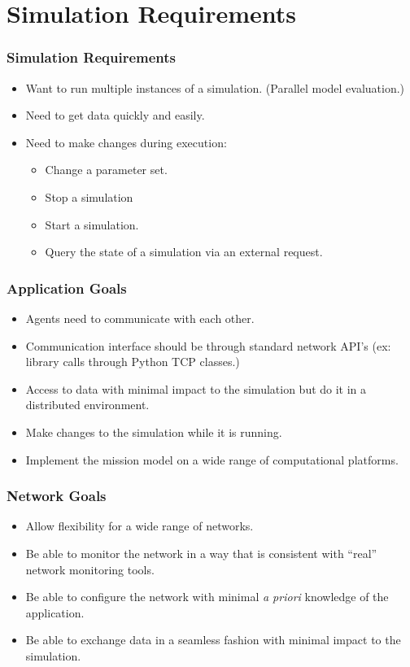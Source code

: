 \documentclass{beamer}
\begin{document}
\section{Simulation Requirements}

\begin{frame}
  \frametitle{Simulation Requirements}

  \begin{itemize}
  \item Want to run multiple instances of a simulation. (Parallel
    model evaluation.)
  \item Need to get data quickly and easily.
  \item Need to make changes during execution:
    \begin{itemize}
    \item Change a parameter set.
    \item Stop a simulation
    \item Start a simulation.
    \item Query the state of a simulation via an external request.
    \end{itemize}
  \end{itemize}

\end{frame}


\begin{frame}
  \frametitle{Application Goals}

  \begin{itemize}
  \item Agents need to communicate with each other.
  \item Communication interface should be through standard network
    API's (ex: library calls through Python TCP classes.)
  \item Access to data with minimal impact to the simulation but do it
    in a distributed environment.
  \item Make changes to the simulation while it is running.
  \item Implement the mission model on a wide range of computational
    platforms.
  \end{itemize}


\end{frame}

\begin{frame}
  \frametitle{Network Goals}

  \begin{itemize}
  \item Allow flexibility for a wide range of networks.
  \item Be able to monitor the network in a way that is consistent
    with ``real'' network monitoring tools.
  \item Be able to configure the network with minimal \textit{a
      priori} knowledge of the application.
  \item Be able to exchange data in a seamless fashion with minimal
    impact to the simulation.
  \end{itemize}

\end{frame}
\end{document}
